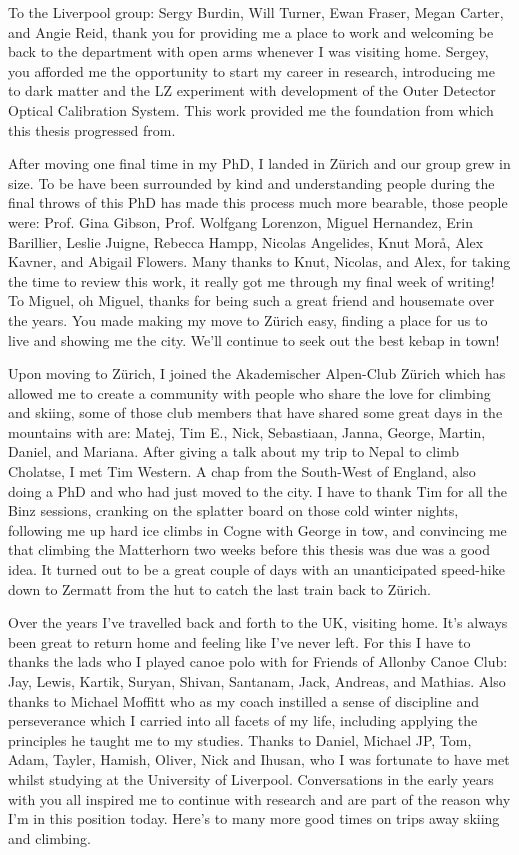\documentclass[a4paper,11pt,usegeometry]{scrreprt} %
\begin{document}
To the Liverpool group: Sergy Burdin, Will Turner, Ewan Fraser, Megan Carter, and Angie Reid, thank you for providing me a place to work and welcoming be back to the department with open arms whenever I was visiting home. Sergey, you afforded me the opportunity to start my career in research, introducing me to dark matter and the LZ experiment with development of the Outer Detector Optical Calibration System. This work provided me the foundation from which this thesis progressed from.

After moving one final time in my PhD, I landed in Z\"urich and our group grew in size. To be have been surrounded by kind and understanding people during the final throws of this PhD has made this process much more bearable, those people were: Prof. Gina Gibson, Prof. Wolfgang Lorenzon, Miguel Hernandez, Erin Barillier, Leslie Juigne, Rebecca Hampp, Nicolas Angelides, Knut Mor\aa, Alex Kavner, and Abigail Flowers. Many thanks to Knut, Nicolas, and Alex, for taking the time to review this work, it really got me through my final week of writing! To Miguel, oh Miguel, thanks for being such a great friend and housemate over the years. You made making my move to Z\"urich easy, finding a place for us to live and showing me the city. We'll continue to seek out the best kebap in town!

Upon moving to Z\"urich, I joined the Akademischer Alpen-Club Z\"urich which has allowed me to  create a community with people who share the love for climbing and skiing, some of those club members that have shared some great days in the mountains with are: Matej, Tim E., Nick, Sebastiaan, Janna, George, Martin, Daniel, and Mariana. After giving a talk about my trip to Nepal to climb Cholatse, I met Tim Western. A chap from the South-West of England, also doing a PhD and who had just moved to the city. I have to thank Tim for all the Binz sessions, cranking on the splatter board on those cold winter nights, following me up hard ice climbs in Cogne with George in tow, and convincing me that climbing the Matterhorn two weeks before this thesis was due was a good idea. It turned out to be a great couple of days with an unanticipated speed-hike down to Zermatt from the hut to catch the last train back to Z\"urich.

Over the years I've travelled back and forth to the UK, visiting home. It's always been great to return home and feeling like I've never left. For this I have to thanks the lads who I played canoe polo with for Friends of Allonby Canoe Club: Jay, Lewis, Kartik, Suryan, Shivan, Santanam, Jack, Andreas, and Mathias. Also thanks to Michael Moffitt who as my coach instilled a sense of discipline and perseverance which I carried into all facets of my life, including applying the principles he taught me to my studies. Thanks to Daniel, Michael JP, Tom, Adam, Tayler, Hamish, Oliver, Nick and Ihusan, who I was fortunate to have met whilst studying at the University of Liverpool. Conversations in the early years with you all inspired me to continue with research and are part of the reason why I'm in this position today. Here's to many more good times on trips away skiing and climbing.
\end{document}
